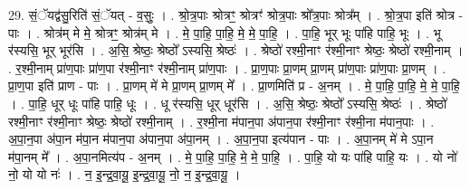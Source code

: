 \documentclass[17pt]{extarticle}
\begin{document}
29. सं॒ॅयद्व॑सु॒रिति॑ सं॒ॅयत् - व॒सुः॒ । . श्रो॒त्र॒पाः श्रोत्रꣳ॒॒ श्रोत्रꣳ॑ श्रोत्र॒पाः श्रो᳚त्र॒पाः श्रोत्र᳚म् । . श्रो॒त्र॒पा इति॑ श्रोत्र - पाः । . श्रोत्र॑म् मे मे॒ श्रोत्रꣳ॒॒ श्रोत्र॑म् मे । . मे॒ पा॒हि॒ पा॒हि॒ मे॒ मे॒ पा॒हि॒ । . पा॒हि॒ भूर् भूः पा॑हि पाहि॒ भूः । . भू र॑स्यसि॒ भूर् भूर॑सि । . अ॒सि॒ श्रेष्ठः॒ श्रेष्ठो᳚ ऽस्यसि॒ श्रेष्ठः॑ । . श्रेष्ठो॑ रश्मी॒नाꣳ र॑श्मी॒नाꣳ श्रेष्ठः॒ श्रेष्ठो॑ रश्मी॒नाम् । . र॒श्मी॒नाम् प्रा॑ण॒पाः प्रा॑ण॒पा र॑श्मी॒नाꣳ र॑श्मी॒नाम् प्रा॑ण॒पाः । . प्रा॒ण॒पाः प्रा॒णम् प्रा॒णम् प्रा॑ण॒पाः प्रा॑ण॒पाः प्रा॒णम् । . प्रा॒ण॒पा इति॑ प्राण - पाः । . प्रा॒णम् मे॑ मे प्रा॒णम् प्रा॒णम् मे᳚ । . प्रा॒णमिति॑ प्र - अ॒नम् । . मे॒ पा॒हि॒ पा॒हि॒ मे॒ मे॒ पा॒हि॒ । . पा॒हि॒ धूर् धूः पा॑हि पाहि॒ धूः । . धू र॑स्यसि॒ धूर् धूर॑सि । . अ॒सि॒ श्रेष्ठः॒ श्रेष्ठो᳚ ऽस्यसि॒ श्रेष्ठः॑ । . श्रेष्ठो॑ रश्मी॒नाꣳ र॑श्मी॒नाꣳ श्रेष्ठः॒ श्रेष्ठो॑ रश्मी॒नाम् । . र॒श्मी॒ना म॑पान॒पा अ॑पान॒पा र॑श्मी॒नाꣳ र॑श्मी॒ना म॑पान॒पाः । . अ॒पा॒न॒पा अ॑पा॒न म॑पा॒न म॑पान॒पा अ॑पान॒पा अ॑पा॒नम् । . अ॒पा॒न॒पा इत्य॑पान - पाः । . अ॒पा॒नम् मे॑ मे ऽपा॒न म॑पा॒नम् मे᳚ । . अ॒पा॒नमित्य॑प - अ॒नम् । . मे॒ पा॒हि॒ पा॒हि॒ मे॒ मे॒ पा॒हि॒ । . पा॒हि॒ यो यः पा॑हि पाहि॒ यः । . यो नो॑ नो॒ यो यो नः॑ । . न॒ इ॒न्द्र॒वा॒यू॒ इ॒न्द्र॒वा॒यू॒ नो॒ न॒ इ॒न्द्र॒वा॒यू॒ । \newline
\end{document}
